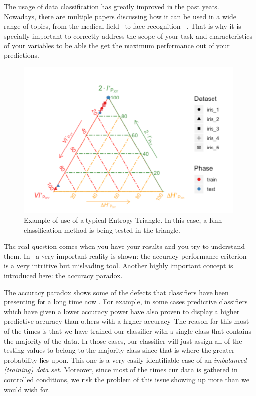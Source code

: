 The usage of data classification has greatly improved in the past years. Nowadays, there are multiple papers discussing how it can be used in a wide range of topics, from the medical field~\cite{Medical_Classification} to face recognition~\cite{Balaban_2015} . That is why it is specially important to correctly address the scope of your task and characteristics of your variables to be able the get the maximum performance out of your predictions.\par
%
\begin{figure}[H]
 \centering
  \includegraphics[width=15cm]{Figuras_tfg/Example_ET}
  \caption{Example of use of a typical Entropy Triangle. In this case, a Knn classification method is being tested in the triangle.}
 \label{fig:figure_example_et}
\end{figure} 

The real question comes when you have your results and you try to understand them. In~\cite{val:pel:14a} a very important reality is shown: the accuracy performance criterion is a very intuitive but misleading tool. Another highly important concept is introduced here: the accuracy paradox. 

The accuracy paradox shows some of the defects that classifiers have been presenting for a long time now . For example, in some cases predictive classifiers which have given a lower accuracy power have also proven to display a higher predictive accuracy than others with a higher accuracy. The reason for this most of the times is that we have trained our classifier with a single class that contains the majority of the data. In those cases, our classifier will just assign all of the testing values to belong to the majority class since that is where the greater probability lies upon. This one is a very easily identifiable case of an \emph{imbalanced (training) data set.} Moreover, since most of the times our data is gathered in controlled conditions, we risk the problem of this issue showing up more than we would wish for.\par

